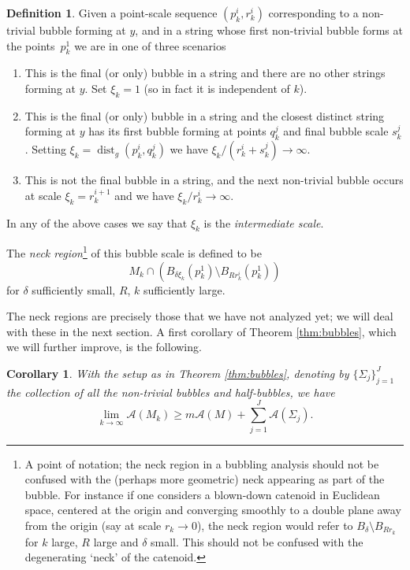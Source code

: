 \documentclass[10pt]{amsart}
\let\mathcal\mathscr
\newcounter{cas}
\DeclareMathOperator{\dist}{dist}
\newtheorem{cor}[thm]{Corollary}
\theoremstyle{definition}
\newtheorem{definition}[thm]{Definition}
\begin{document}
\begin{definition}\label{def:int}
Given a point-scale sequence $(p^i_k, r^i_k)$ corresponding to a non-trivial bubble forming at $y$, and in a string whose first non-trivial bubble forms at the points~$p^1_k$ we are in one of three scenarios
\begin{enumerate}
\item This is the final (or only) bubble in a string and there are no other strings forming at $y$. Set $\xi_k = 1$ (so in fact it is independent of $k$).
\item This is the final (or only) bubble in a string and the closest distinct string forming at $y$ has its first bubble forming at points $q^j_k$ and final bubble scale $s^j_k$. Setting $\xi_k = \dist_g(p^i_k,q^j_k)$ we have $\xi_k/(r^i_k+s^j_k) \to \infty$.
\item This is not the final bubble in a string, and the next non-trivial bubble occurs at scale $\xi_k = r^{i+1}_k$ and we have $\xi_k/r^i_k \to \infty$.
\end{enumerate}
In any of the above cases we say that $\xi_k$ is the \emph{intermediate scale}.

The \emph{neck region}\footnote{A point of notation; the neck region in a bubbling analysis should not be confused with the (perhaps more geometric) neck appearing as part of the bubble. For instance if one considers a blown-down catenoid in Euclidean space, centered at the origin and converging smoothly to a double plane away from the origin (say at scale $r_k \to 0$), the neck region would refer to $B_{\delta}\setminus B_{Rr_k}$ for $k$ large, $R$ large and $\delta$ small. This should not be confused with the degenerating `neck' of the catenoid.} of this bubble scale is defined to be
$$M_k\cap (B_{\delta \xi_k}(p^1_k)\setminus B_{R r^i_k}(p^1_k))$$
for $\delta$ sufficiently small, $R$, $k$ sufficiently large.
\end{definition}

The neck regions are precisely those that we have not analyzed yet; we will deal with these in the next section.
A first corollary of Theorem \ref{thm:bubbles}, which we will further improve, is the following.

\begin{cor}\label{cor:bubbles}
With the setup as in Theorem \ref{thm:bubbles}, denoting by $\{\Sigma_j\}_{j=1}^J$ the collection of all the non-trivial bubbles and half-bubbles, we have
\begin{equation*}
\lim_{k\to\infty}\mathcal{A}(M_k) \geq m\mathcal{A}(M) + \sum_{j=1}^J \mathcal{A}(\Sigma_j).
\end{equation*}
\end{cor}
\end{document}
